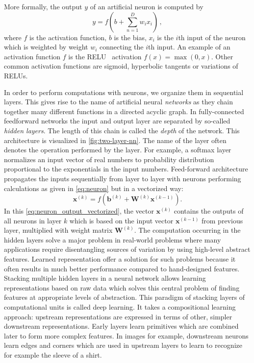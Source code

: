 \documentclass[\home/main.tex]{subfiles}
\begin{document}
More formally, the output $y$ of an artificial neuron is computed by
\begin{equation}\label{eq:neuron}
	y = f\left(b + \sum_{n = 1}^{D} w_i x_i \right)\,,
\end{equation}
where $f$ is the activation function, $b$ is the bias, $x_i$ is the $i$th input of the neuron which is weighted by weight $w_i$ connecting the $i$th input. An example of an activation function $f$ is the \gls{RELU}~\autocite{glorot2011deep} activation $f(x) = \max(0, x)$. Other common activation functions are sigmoid, hyperbolic tangents or variations of \glspl{RELU}.

In order to perform computations with neurons, we organize them in sequential layers. This gives rise to the name of artificial neural \textit{networks} as they chain together many different functions in a directed acyclic graph. In fully-connected feedforward networks the input and output layer are separated by so-called \textit{hidden layers}. The length of this chain is called the \emph{depth} of the network. This architecture is visualized in \cref{fig:two-layer-nn}. The name of the layer often denotes the operation performed by the layer. For example, a softmax layer normalizes an input vector of real numbers to probability distribution proportional to the exponentials in the input numbers. Feed-forward architecture propagates the inputs sequentially from layer to layer with neurons performing calculations as given in \cref{eq:neuron} but in a vectorized way:
\begin{equation} \label{eq:neuron_output_vectorized}
	\mathbf{x}^{(k)}=f\left(\mathbf{b}^{(k)} + \mathbf{W}^{(k)} \mathbf{x}^{(k-1)}\right).
\end{equation}
In this \cref{eq:neuron_output_vectorized}, the vector $\mathbf{x}^{(k)}$ contains the outputs of all neurons in layer $k$ which is based on the input vector $\mathbf{x}^{(k-1)}$ from previous layer, multiplied with weight matrix $\mathbf{W}^{(k)}$. The computation occurring in the hidden layers solve a major problem in real-world problems where many applications require disentangling sources of variation by using high-level abstract features. Learned representation offer a solution for such problems because it often results in much better performance compared to hand-designed features. Stacking multiple hidden layers in a neural network allows learning representations based on raw data which solves this central problem of finding features at appropriate levels of abstraction. This paradigm of stacking layers of computational units is called deep learning. It takes a compositional learning approach: upstream representations are expressed in terms of other, simpler downstream representations. Early layers learn primitives which are combined later to form more complex features. In images for example, downstream neurons learn edges and corners which are used in upstream layers to learn to recognize for example the sleeve of a shirt.
\end{document}
